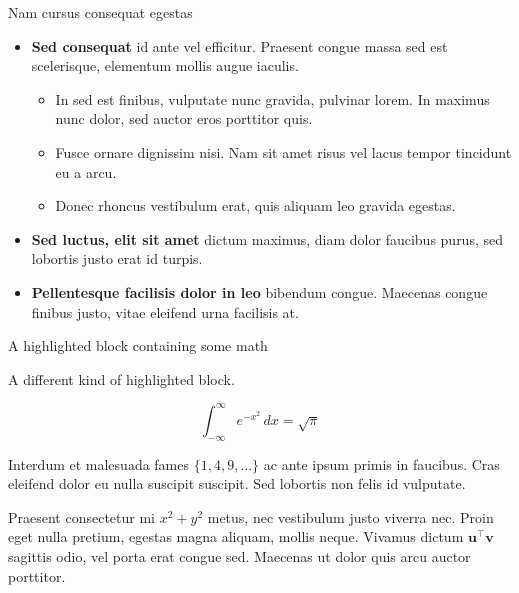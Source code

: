 \documentclass[final]{beamer}
\newlength{\colwidth}
\begin{document}
\begin{frame}[t]
\begin{columns}[t]
\begin{column}{\colwidth}
\begin{block}{Nam cursus consequat egestas}
                    \begin{itemize}
                        \item \textbf{Sed consequat} id ante vel efficitur. Praesent congue massa
                        sed est scelerisque, elementum mollis augue iaculis.
                        \begin{itemize}
                            \item In sed est finibus, vulputate
                            nunc gravida, pulvinar lorem. In maximus nunc dolor, sed auctor eros
                            porttitor quis.
                            \item Fusce ornare dignissim nisi. Nam sit amet risus vel lacus
                            tempor tincidunt eu a arcu.
                            \item Donec rhoncus vestibulum erat, quis aliquam leo
                            gravida egestas.
                        \end{itemize}
                        \item \textbf{Sed luctus, elit sit amet} dictum maximus, diam dolor
                        faucibus purus, sed lobortis justo erat id turpis.
                        \item \textbf{Pellentesque facilisis dolor in leo} bibendum congue.
                        Maecenas congue finibus justo, vitae eleifend urna facilisis at.
                    \end{itemize}

                \end{block}


                \begin{exampleblock}{A highlighted block containing some math}

                    A different kind of highlighted block.

                    $$
                    \int_{-\infty}^{\infty} e^{-x^2}\,dx = \sqrt{\pi}
                    $$

                    Interdum et malesuada fames $\{1, 4, 9, \ldots\}$ ac ante ipsum primis in
                    faucibus. Cras eleifend dolor eu nulla suscipit suscipit. Sed lobortis non
                    felis id vulputate.


                    Praesent consectetur mi $x^2 + y^2$ metus, nec vestibulum justo viverra
                    nec. Proin eget nulla pretium, egestas magna aliquam, mollis neque. Vivamus
                    dictum $\mathbf{u}^\intercal\mathbf{v}$ sagittis odio, vel porta erat
                    congue sed. Maecenas ut dolor quis arcu auctor porttitor.


\end{exampleblock}
\end{column}
\end{columns}
\end{frame}
\end{document}
